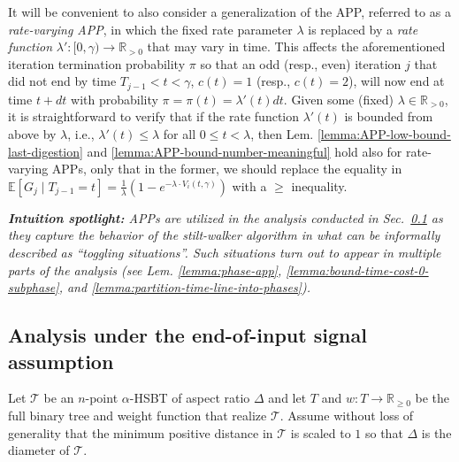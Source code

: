 \documentclass[11pt]{article}
\def\LongVersion{}
\def\LongVersionEnd{}
\theoremstyle{definition}
\theoremstyle{plain}
\theoremstyle{definition}
\theoremstyle{plain}
\theoremstyle{definition}
\theoremstyle{plain}
\newenvironment{IntuitionSpotlight}[0]
{\par%
\setlength{\leftskip}{0.5\parindent}%
\setlength{\rightskip}{0.5\parindent}%
\noindent\itshape\textbf{Intuition spotlight:}}
{\par\ignorespacesafterend}
\newcommand{\Sect}{Sec.}
\newcommand{\Lem}{Lem.}
\newcommand{\Reals}{\mathbb{R}}
\newcommand{\Expect}{\mathbb{E}}
\begin{document}
\LongVersion %
It will be convenient to also consider a generalization of the APP, referred to
as a \emph{rate-varying APP}, in which the fixed rate parameter $\lambda$ is
replaced by a \emph{rate function}
$\lambda' : [0, \gamma) \rightarrow \Reals_{> 0}$
that may vary in time.
This affects the aforementioned iteration termination probability $\pi$ so
that an odd (resp., even) iteration $j$ that did not end by time
$T_{j - 1} < t < \gamma$,
$c(t) = 1$
(resp.,
$c(t) = 2$),
will now end at time $t + d t$ with probability
$\pi = \pi(t) = \lambda'(t) d t$.
Given some (fixed)
$\lambda \in \Reals_{> 0}$,
it is straightforward to verify that if the rate function $\lambda'(t)$ is
bounded from above by $\lambda$, i.e.,
$\lambda'(t) \leq \lambda$
for all
$0 \leq t < \lambda$,
then \Lem{} \ref{lemma:APP-low-bound-last-digestion} and
\ref{lemma:APP-bound-number-meaningful} hold also for rate-varying APPs,
only that in the former, we should replace the equality in
$\Expect[G_{j} \mid T_{j - 1} = t]
=
\frac{1}{\lambda} \left( 1 - e^{-\lambda \cdot V_{i}(t, \gamma)} \right)$
with a $\geq$ inequality.
\LongVersionEnd %

\begin{IntuitionSpotlight}
APPs are utilized in the analysis conducted in
\Sect{}~\ref{section:analysis-heart} as they capture the behavior of the
stilt-walker algorithm in what can be informally described as ``toggling
situations''.
Such situations turn out to appear in multiple parts of the analysis (see
\Lem{} \ref{lemma:phase-app}, \ref{lemma:bound-time-cost-0-subphase}, and
\ref{lemma:partition-time-line-into-phases}).
\end{IntuitionSpotlight}

\subsection{Analysis under the end-of-input signal assumption}
\label{section:analysis-heart}
Let $\mathcal{T}$ be an $n$-point $\alpha$-HSBT of aspect ratio $\Delta$
and let $T$ and
$w : T \rightarrow \Reals_{\geq 0}$
be the full binary tree and weight function that realize $\mathcal{T}$.
Assume without loss of generality that the minimum positive distance in
$\mathcal{T}$ is scaled to $1$ so that $\Delta$ is the diameter of
$\mathcal{T}$.
\end{document}
